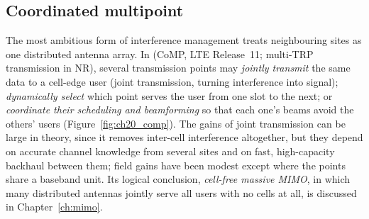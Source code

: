 \subsection{Coordinated multipoint}

The most ambitious form of interference management treats neighbouring sites as one distributed antenna array.
In  (CoMP, LTE Release~11; multi-TRP transmission in NR), several transmission
points may \emph{jointly transmit} the same data to a cell-edge user (joint transmission, turning interference into
signal); \emph{dynamically select} which point serves the user from one slot to the next; or
\emph{coordinate their scheduling and beamforming} so that each one's beams avoid the others' users
(Figure~\ref{fig:ch20_comp}). The gains of joint transmission can be large in theory, since it removes inter-cell
interference altogether, but they depend on accurate channel knowledge from several sites and on fast,
high-capacity backhaul between them; field gains have been modest except where the points share a baseband unit.
Its logical conclusion, \emph{cell-free massive MIMO}, in which many distributed antennas jointly serve all users
with no cells at all, is discussed in Chapter~\ref{ch:mimo}.

